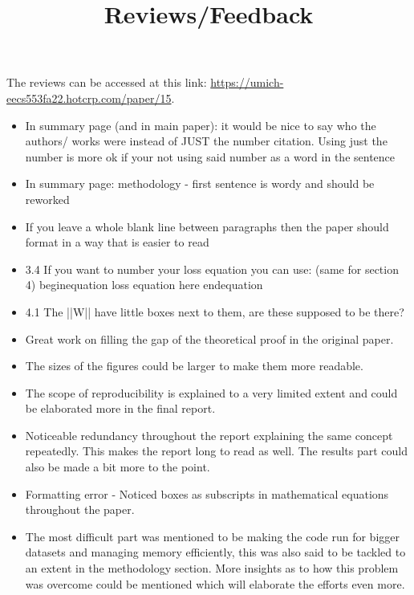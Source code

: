 \documentclass{amsart}
\title{Reviews/Feedback}
\begin{document}
The reviews can be accessed at this link: \href{https://umich-eecs553fa22.hotcrp.com/paper/15}{https://umich-eecs553fa22.hotcrp.com/paper/15}.

\begin{itemize}
    \item In summary page (and in main paper): it would be nice to say who the authors/ works were instead of JUST the number citation. Using just the number is more ok if your not using said number as a word in the sentence
    
    \item In summary page: methodology - first sentence is wordy and should be reworked
    
    \item If you leave a whole blank line between paragraphs then the paper should format in a way that is easier to read
    
    \item 3.4 If you want to number your loss equation you can use: (same for section 4) begin{equation} loss equation here end{equation}
    
    \item 4.1 The ||W|| have little boxes next to them, are these supposed to be there?
    
    \item Great work on filling the gap of the theoretical proof in the original paper. 
    
    \item The sizes of the figures could be larger to make them more readable.
    
    \item The scope of reproducibility is explained to a very limited extent and could be elaborated more in the final report.

    \item Noticeable redundancy throughout the report explaining the same concept repeatedly. This makes the report long to read as well. The results part could also be made a bit more to the point.

    \item Formatting error - Noticed boxes as subscripts in mathematical equations throughout the paper.

    \item The most difficult part was mentioned to be making the code run for bigger datasets and managing memory efficiently, this was also said to be tackled to an extent in the methodology section. More insights as to how this problem was overcome could be mentioned which will elaborate the efforts even more.


\end{itemize}
\end{document}
